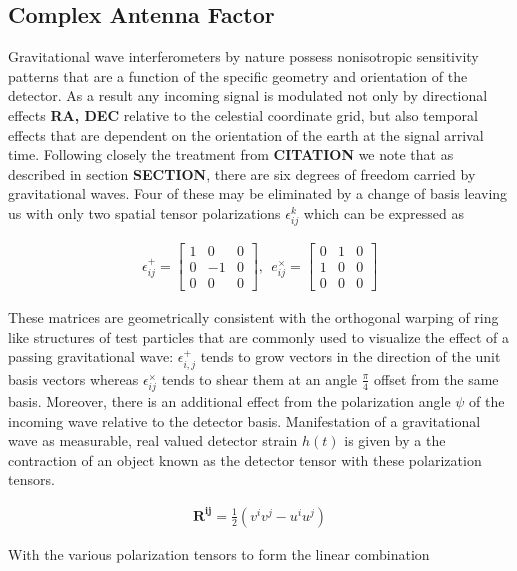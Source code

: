 \subsection{Complex Antenna Factor}
Gravitational wave interferometers by nature possess nonisotropic sensitivity patterns that are a function of the specific geometry and orientation of the detector. As a result any incoming signal is modulated not only by directional effects \textbf{RA, DEC} relative to the celestial coordinate grid, but also temporal effects that are dependent on the orientation of the earth at the signal arrival time. Following closely the treatment from \textbf{CITATION} we note that as described in section \textbf{SECTION}, there are six degrees of freedom carried by gravitational waves. Four of these may be eliminated by a change of basis leaving us with only two spatial tensor polarizations $\epsilon^k_{ij}$ which can be expressed as 

\begin{align}
\epsilon^+_{ij} = 
\begin{bmatrix}
1 & 0 & 0 \\
0 & -1 & 0 \\
0 & 0 & 0
\end{bmatrix}
, \ \ e^{\times}_{ij} =
\begin{bmatrix}
0 & 1 & 0 \\
1 & 0 & 0 \\
0 & 0 & 0
\end{bmatrix}
\end{align}

These matrices are geometrically consistent with the orthogonal warping of ring like structures of test particles that are commonly used to visualize the effect of a passing gravitational wave: $\epsilon^+_{i,j}$ tends to grow vectors in the direction of the unit basis vectors whereas $\epsilon^{\times}_{ij}$ tends to shear them at an angle $\frac{\pi}{4}$ offset from the same basis. Moreover, there is an additional effect from the polarization angle $\psi$ of the incoming wave relative to the detector basis. Manifestation of a gravitational wave as measurable, real valued detector strain $h(t)$ is given by a the contraction of an object known as the detector tensor with these polarization tensors. 

\begin{align}
\mathbf{R^{ij}} = \frac{1}{2}(v^i v^j - u^i u^j)
\end{align}

With the various polarization tensors to form the linear combination 

